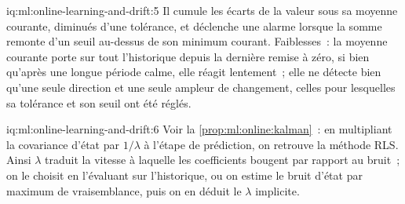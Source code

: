 \begin{solution}{iq:ml:online-learning-and-drift:5}
Il cumule les écarts de la valeur sous sa moyenne courante, diminués d'une tolérance, et déclenche une alarme lorsque la somme remonte
d'un seuil au-dessus de son minimum courant. Faiblesses~: la moyenne courante porte sur tout l'historique depuis la dernière remise à zéro, si bien qu'après une
longue période calme, elle réagit lentement~; elle ne détecte bien qu'une seule direction et une seule ampleur de changement, celles pour lesquelles sa tolérance et
son seuil ont été réglés.
\end{solution}

\begin{solution}{iq:ml:online-learning-and-drift:6}
Voir la \cref{prop:ml:online:kalman}~: en multipliant la covariance d'état par $1/\lambda$ à l'étape de prédiction, on retrouve la méthode RLS. Ainsi
$\lambda$ traduit la vitesse à laquelle les coefficients bougent par rapport au bruit~; on le choisit en l'évaluant sur l'historique, ou on estime le
bruit d'état par maximum de vraisemblance, puis on en déduit le $\lambda$ implicite.
\end{solution}

